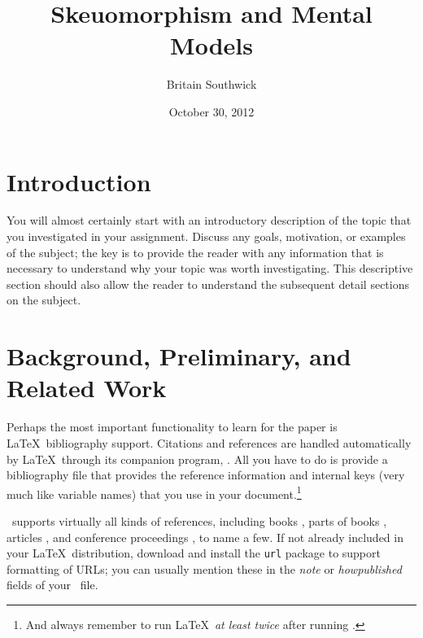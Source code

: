 \documentclass{article}
\title{Skeuomorphism and Mental Models}
\author{Britain Southwick}
\date{October 30, 2012}
\begin{document}
\maketitle

\abstract{

}

\pagebreak
\tableofcontents

\pagebreak
\listoffigures

\pagebreak
\listoftables

\pagebreak

%
%
\section{Introduction}
\label{introduction}

You will almost certainly start with an introductory description of the topic that you investigated in your assignment.  Discuss any goals, motivation, or examples of the subject; the key is to provide the reader with any information that is necessary to understand why your topic was worth investigating.  This descriptive section should also allow the reader to understand the subsequent detail sections on the subject.

\section{Background, Preliminary, and Related Work}

Perhaps the most important functionality to learn for the paper is \LaTeX\ bibliography support.  Citations and references are handled automatically by \LaTeX\ through its companion program, \BibTeX.  All you have to do is provide a bibliography file that provides the reference information and internal keys (very much like variable names) that you use in your document.\footnote{And always remember to run \LaTeX\ \emph{at least twice} after running \BibTeX.}

\BibTeX\ supports virtually all kinds of references, including books \cite{dui,sgg,iokit,palmos}, parts of books \cite{userModeLinux}, articles \cite{nielsen:dui-review,heer-shneiderman,stackableThreads,xpkernel}, and conference proceedings \cite{ux-3d,iring,contextFileSearch,osHaskell,hibernator}, to name a few.  If not already included in your \LaTeX\ distribution, download and install the \texttt{url} package to support formatting of URLs; you can usually mention these in the \emph{note} or \emph{howpublished} fields of your \BibTeX\ file.
\end{document}
